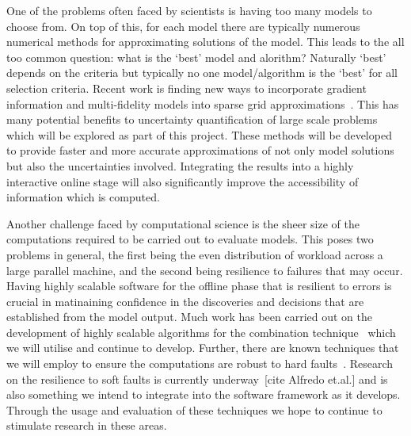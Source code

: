 \documentclass[a4paper,fontsize=12pt]{scrartcl}
\begin{document}
One of the problems often faced by scientists is having too many models 
to choose from. On top of this, for each model there are typically numerous
numerical methods for approximating solutions of the model.
This leads to the all too common question: what is the `best' model and alorithm?
Naturally `best' depends on the criteria but typically no one model/algorithm is
the `best' for all selection criteria.
Recent work is finding new ways to incorporate gradient information and multi-fidelity models into sparse grid approximations~\cite{deBaarHarding2015,Jakeman2015,deBaarRDM2015}. 
This has many potential benefits to uncertainty quantification of large scale problems which will be explored as part of this project.
These methods will be developed to provide faster and more accurate approximations of not only model solutions but also the uncertainties involved.
Integrating the results into a highly interactive online stage will also significantly improve the accessibility of information which is computed.

Another challenge faced by computational science is the sheer size of the computations required to be carried out to evaluate models. 
This poses two problems in general, the first being the even distribution of workload across a large parallel machine, and the second being resilience to failures that may occur.
Having highly scalable software for the offline phase that is resilient to errors is crucial in matinaining confidence in the discoveries and decisions that are established from the model output.
Much work has been carried out on the development of highly scalable algorithms for the combination technique~\cite{StrazdinsEtal2015} which we will utilise and continue to develop.
Further, there are known techniques that we will employ to ensure the computations are robust to hard faults~\cite{HardingHLS2015,AliEtal2015}.
Research on the resilience to soft faults is currently underway~[cite Alfredo et.al.] and is also something we intend to integrate into the software framework as it develops. 
Through the usage and evaluation of these techniques we hope to continue to stimulate research in these areas.
\end{document}

